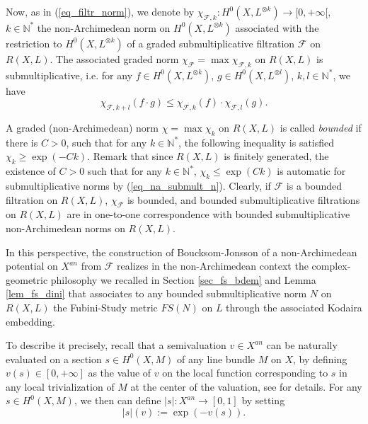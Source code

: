 \documentclass[12pt]{article}
\numberwithin{equation}{section}
\theoremstyle{theorem}
\theoremstyle{definition}
\theoremstyle{remark}
\newcommand{\nat}{\mathbb{N}}
\begin{document}
	Now, as in (\ref{eq_filtr_norm}), we denote by  $\chi_{\mathcal{F}, k} : H^0(X, L^{\otimes k}) \to [0, +\infty[$, $k \in \nat^*$ the non-Archimedean norm on $H^0(X, L^{\otimes k})$ associated with the restriction to $H^0(X, L^{\otimes k})$ of a graded submultiplicative filtration $\mathcal{F}$ on $R(X, L)$.
	The associated graded norm $\chi_{\mathcal{F}} = \max \chi_{\mathcal{F}, k}$ on $R(X, L)$ is submultiplicative, i.e. for any $f \in H^0(X, L^{\otimes k})$, $g \in H^0(X, L^{\otimes l})$, $k, l \in \nat^*$, we have
	\begin{equation}\label{eq_na_submult_n}
		\chi_{\mathcal{F}, k + l}(f \cdot g) \leq \chi_{\mathcal{F}, k}(f) \cdot \chi_{\mathcal{F}, l}(g).
	\end{equation}
	\par 
	A graded (non-Archimedean) norm $\chi = \max \chi_k$ on $R(X, L)$ is called \textit{bounded} if there is $C > 0$, such that for any $k \in \nat^*$,  the following inequality is satisfied $\chi_k \geq \exp(- C k)$.
	Remark that since $R(X, L)$ is finitely generated, the existence of $C > 0$ such that for any $k \in \nat^*$, $\chi_k \leq \exp(C k)$ is automatic for submultiplicative norms by (\ref{eq_na_submult_n}).
	Clearly, if $\mathcal{F}$ is a bounded filtration on $R(X, L)$, $\chi_{\mathcal{F}}$ is bounded, and bounded submultiplicative filtrations on $R(X, L)$ are in one-to-one correspondence with bounded submultiplicative non-Archimedean norms on $R(X, L)$.
	\par 
	In this perspective, the construction of Boucksom-Jonsson \cite{BouckJohn21} of a non-Archimedean potential on $X^{an}$ from $\mathcal{F}$ realizes in the non-Archimedean context the complex-geometric philosophy we recalled in Section \ref{sec_fs_bdem} and Lemma \ref{lem_fs_dini} that associates to any bounded submultiplicative norm $N$ on $R(X, L)$ the Fubini-Study metric $FS(N)$ on $L$ through the associated Kodaira embedding.
	\par 
	To describe it precisely, recall that a semivaluation $v \in X^{an}$ can be naturally evaluated on a section $s \in H^0(X, M)$ of any line bundle $M$ on $X$, by defining $v(s) \in [0, +\infty]$ as the value of $v$ on the local function corresponding to $s$ in any local trivialization of $M$ at the center of the valuation, see \cite[p. 15]{BouckJohn21} for details. 
	For any $s \in H^0(X, M)$, we then can define $|s| : X^{an} \to [0, 1]$ by setting
	\begin{equation}\label{eq_nm_s_defn}
		|s|(v) := \exp(-v(s)).
	\end{equation}
\end{document}
